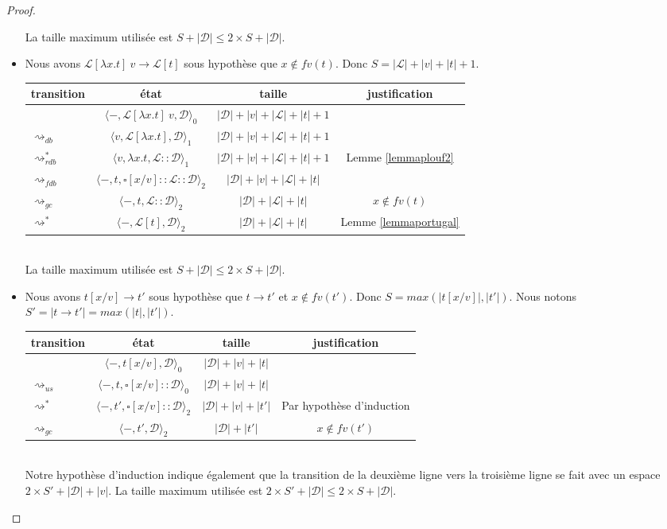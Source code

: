 \documentclass[11pt,a4paper]{article}
\theoremstyle{definition}
\newcommand{\etatz}[1]{\langle #1 \rangle_0}
\newcommand{\etatu}[1]{\langle #1 \rangle_1}
\newcommand{\etatd}[1]{\langle #1 \rangle_2}
\newcommand{\mtd}{\mathcal{D}}
\newcommand{\mtl}{\mathcal{L}}
\begin{document}
\begin{proof}
\begin{itemize}
      La taille maximum utilisée est $S +|\mtd| \le 2\times S +|\mtd|$.
    \item {} Nous avons $\mtl[\lambda x.t]~v \rightarrow \mtl[t]$ sous hypothèse que $x\notin fv(t)$. Donc $S = |\mtl|+|v|+|t|+1$.\\
      \begin{tabular}{@{}l c c c@{}}
        \toprule
        transition & état & taille & justification\\
        \midrule
                   & $\etatz{-,\mtl[\lambda x.t]~v,\mtd}$ & $|\mtd|+|v|+|\mtl|+|t|+1$\\
        $\rightsquigarrow_{db}$ & $ \etatu{v, \mtl[ \lambda x.t], \mtd}$ & $|\mtd| + |v| + |\mtl|+|t|+1$\\ 
        $\rightsquigarrow^*_{rdb}$ & $ \etatu{v, \lambda x.t ,\mtl::\mtd}$ & $|\mtd| + |v| + |\mtl|+|t|+1$& Lemme \ref{lemmaplouf2}\\
        $\rightsquigarrow_{fdb}$ & $ \etatd{-, t ,\square[x/v]::\mtl::\mtd}$ & $|\mtd| + |v| + |\mtl|+|t|$\\
        $\rightsquigarrow_{gc}$ & $ \etatd{-, t ,\mtl::\mtd}$ & $|\mtd| + |\mtl|+|t|$& $x\notin fv(t)$\\
        $\rightsquigarrow^*$ & $ \etatd{-, \mtl[t],\mtd}$ & $|\mtd| + |\mtl|+|t|$ &Lemme \ref{lemmaportugal}\\ 
        \bottomrule
      \end{tabular}\\
      La taille maximum utilisée est $S +|\mtd| \le 2\times S +|\mtd|$.
    \item {} Nous avons $t[x/v] \rightarrow t'$ sous hypothèse que $t \rightarrow t'$ et $x\notin fv(t')$. Donc $S = max(|t[x/v]|, |t'|)$. Nous notons $S' = |t \rightarrow t'| = max(|t|, |t'|)$.\\
      \begin{tabular}{@{}l c c c@{}}
        \toprule
        transition & état & taille & justification\\
        \midrule
                   & $\etatz{-,t[x/v],\mtd}$ & $|\mtd|+|v|+|t|$\\
        $\rightsquigarrow_{us}$ & $ \etatz{-, t, \square[x/v]::\mtd}$ & $|\mtd| + |v| + |t|$\\ 
        $\rightsquigarrow^*$ & $ \etatd{-, t' ,\square[x/v]::\mtd}$ & $|\mtd| + |v| + |t'|$& Par hypothèse d'induction\\
      $\rightsquigarrow_{gc}$ & $ \etatd{-, t' ,\mtd}$ & $|\mtd| + |t'|$&$ x\notin fv(t') $\\
        \bottomrule
      \end{tabular}\\
      Notre hypothèse d'induction indique également que la transition de la deuxième ligne vers la troisième ligne se fait avec un espace $2\times S' +|\mtd| + |v|$. 
      La taille maximum utilisée est $2\times S' +|\mtd| \le 2\times S +|\mtd|$.
  \end{itemize}
\end{proof}
\end{document}
